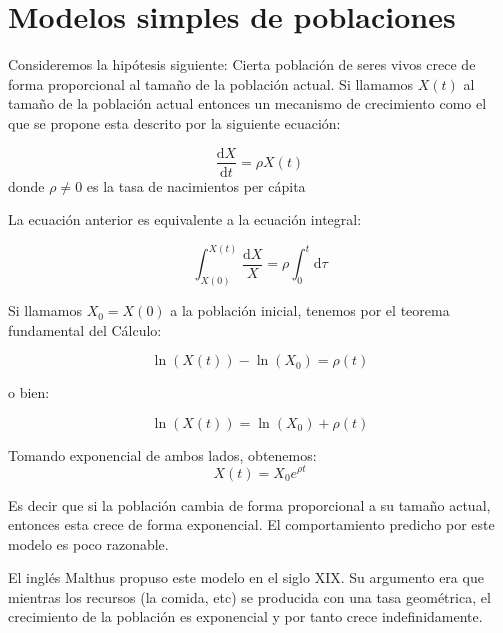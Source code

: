 \section{Modelos simples de poblaciones}

Consideremos la hipótesis siguiente: Cierta población de seres vivos crece de forma proporcional al tamaño de la población actual. Si llamamos $X(t)$ al tamaño de la población actual entonces un mecanismo de crecimiento como el que se propone esta descrito por la siguiente ecuación:

\begin{equation}
    \frac{\mathrm{d}X}{\mathrm{d}t}=\rho X(t)
\end{equation}
donde $\rho\neq 0$ es la tasa de nacimientos per cápita

La ecuación anterior es equivalente a la ecuación integral:

\begin{equation}
    \int_{X(0)}^{X(t)} \frac{\mathrm{d}X}{X} = \rho\int_0^t \mathrm{d}\tau 
\end{equation}

Si llamamos $X_0=X(0)$ a la población inicial, tenemos por el teorema fundamental del Cálculo:

\begin{equation}
    \ln (X(t))-\ln(X_0)=\rho(t)
\end{equation}

o bien:

\begin{equation}
    \ln (X(t))=\ln(X_0)+\rho(t)
\end{equation}

Tomando exponencial de ambos lados, obtenemos:
\begin{equation}
  X(t)= X_0 e^{\rho t} 
\end{equation}

Es decir que si la población cambia de forma proporcional a su tamaño actual, entonces esta crece de forma exponencial. El comportamiento predicho por este modelo es poco razonable. 

El inglés Malthus propuso este modelo en el siglo XIX. Su argumento era que mientras los recursos (la comida, etc) se producida con una tasa geométrica, el crecimiento de la población es exponencial y por tanto crece indefinidamente. 


